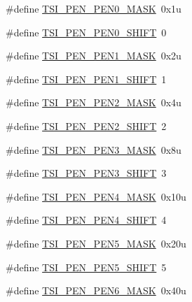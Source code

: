 \begin{DoxyCompactItemize}
\item 
\#define \hyperlink{group___t_s_i___register___masks_ga2fe95bf659075368ab23b5876de8d79d}{T\+S\+I\+\_\+\+P\+E\+N\+\_\+\+P\+E\+N0\+\_\+\+M\+A\+SK}~0x1u
\item 
\#define \hyperlink{group___t_s_i___register___masks_ga74f58c20a9a8ec69dd0d4e5f4e1eb07d}{T\+S\+I\+\_\+\+P\+E\+N\+\_\+\+P\+E\+N0\+\_\+\+S\+H\+I\+FT}~0
\item 
\#define \hyperlink{group___t_s_i___register___masks_gaeefece47c8a990e2b0ee71e68b2e35a7}{T\+S\+I\+\_\+\+P\+E\+N\+\_\+\+P\+E\+N1\+\_\+\+M\+A\+SK}~0x2u
\item 
\#define \hyperlink{group___t_s_i___register___masks_ga8e5d3fd7f263031f112fe920ea105aaf}{T\+S\+I\+\_\+\+P\+E\+N\+\_\+\+P\+E\+N1\+\_\+\+S\+H\+I\+FT}~1
\item 
\#define \hyperlink{group___t_s_i___register___masks_ga851b1c95858be546cf4c5e1975d51823}{T\+S\+I\+\_\+\+P\+E\+N\+\_\+\+P\+E\+N2\+\_\+\+M\+A\+SK}~0x4u
\item 
\#define \hyperlink{group___t_s_i___register___masks_ga0b7c4038dd06f31b5acfbd2be8ff65cf}{T\+S\+I\+\_\+\+P\+E\+N\+\_\+\+P\+E\+N2\+\_\+\+S\+H\+I\+FT}~2
\item 
\#define \hyperlink{group___t_s_i___register___masks_gaaa7f4499e9502211aa3f701ff76cbfd5}{T\+S\+I\+\_\+\+P\+E\+N\+\_\+\+P\+E\+N3\+\_\+\+M\+A\+SK}~0x8u
\item 
\#define \hyperlink{group___t_s_i___register___masks_gaae95322b203c2d62343f500b0c2a5996}{T\+S\+I\+\_\+\+P\+E\+N\+\_\+\+P\+E\+N3\+\_\+\+S\+H\+I\+FT}~3
\item 
\#define \hyperlink{group___t_s_i___register___masks_ga84dcc37edb4ed1b883f85b639092a9cb}{T\+S\+I\+\_\+\+P\+E\+N\+\_\+\+P\+E\+N4\+\_\+\+M\+A\+SK}~0x10u
\item 
\#define \hyperlink{group___t_s_i___register___masks_gab5aa48e30efdd8e8f431087e7c115ef0}{T\+S\+I\+\_\+\+P\+E\+N\+\_\+\+P\+E\+N4\+\_\+\+S\+H\+I\+FT}~4
\item 
\#define \hyperlink{group___t_s_i___register___masks_ga6fa4ed2566d9f9a2ea99816a0f362284}{T\+S\+I\+\_\+\+P\+E\+N\+\_\+\+P\+E\+N5\+\_\+\+M\+A\+SK}~0x20u
\item 
\#define \hyperlink{group___t_s_i___register___masks_gac570df6433fa24603f53ef4ec29d1462}{T\+S\+I\+\_\+\+P\+E\+N\+\_\+\+P\+E\+N5\+\_\+\+S\+H\+I\+FT}~5
\item 
\#define \hyperlink{group___t_s_i___register___masks_ga6ea52be49c67caff3c6aec70425f6da7}{T\+S\+I\+\_\+\+P\+E\+N\+\_\+\+P\+E\+N6\+\_\+\+M\+A\+SK}~0x40u
\item 

\end{DoxyCompactItemize}
